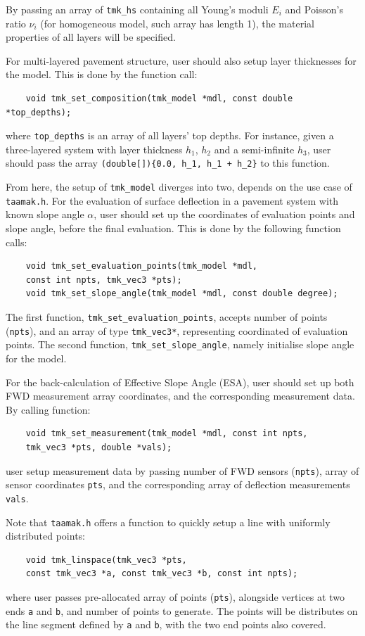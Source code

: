 \documentclass{article}
\begin{document}
By passing an array of \texttt{tmk\_hs} containing all Young's moduli \( E_i \) and Poisson's ratio \( \nu_i \) (for homogeneous model, such array has length 1), the material properties of all layers will be specified.

For multi-layered pavement structure, user should also setup layer thicknesses for the model. This is done by the function call:
\begin{lstlisting}
    void tmk_set_composition(tmk_model *mdl, const double *top_depths);
\end{lstlisting}
where \texttt{top\_depths} is an array of all layers' top depths. For instance, given a three-layered system with layer thickness \( h_1 \), \( h_2 \) and a semi-infinite \( h_3 \), user should pass the array \texttt{(double[])\{0.0, h\_1, h\_1 + h\_2\}} to this function.

From here, the setup of \texttt{tmk\_model} diverges into two, depends on the use case of \texttt{taamak.h}. For the evaluation of surface deflection in a pavement system with known slope angle \( \alpha \), user should set up the coordinates of evaluation points and slope angle, before the final evaluation. This is done by the following function calls:
\begin{lstlisting}
    void tmk_set_evaluation_points(tmk_model *mdl, 
    const int npts, tmk_vec3 *pts);
    void tmk_set_slope_angle(tmk_model *mdl, const double degree);
\end{lstlisting}

The first function, \texttt{tmk\_set\_evaluation\_points}, accepts number of points (\texttt{npts}), and an array of type \texttt{tmk\_vec3*}, representing coordinated of evaluation points. The second function, \texttt{tmk\_set\_slope\_angle}, namely initialise slope angle for the model. 

For the back-calculation of Effective Slope Angle (ESA), user should set up both FWD measurement array coordinates, and the corresponding measurement data. By calling function: 
\begin{lstlisting}
    void tmk_set_measurement(tmk_model *mdl, const int npts, 
    tmk_vec3 *pts, double *vals);
\end{lstlisting}
user setup measurement data by passing number of FWD sensors (\texttt{npts}), array of sensor coordinates \texttt{pts}, and the corresponding array of deflection measurements \texttt{vals}. 

Note that \texttt{taamak.h} offers a function to quickly setup a line with uniformly distributed points: 
\begin{lstlisting}
    void tmk_linspace(tmk_vec3 *pts, 
    const tmk_vec3 *a, const tmk_vec3 *b, const int npts);
\end{lstlisting}
where user passes pre-allocated array of points (\texttt{pts}), alongside vertices at two ends \texttt{a} and \texttt{b}, and number of points to generate. The points will be distributes on the line segment defined by \texttt{a} and \texttt{b}, with the two end points also covered.
\end{document}
